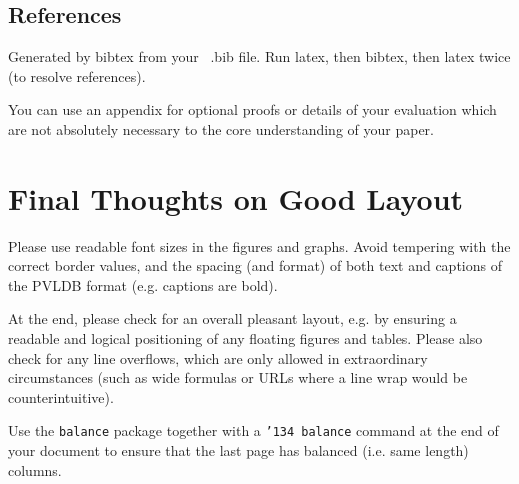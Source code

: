\documentclass{vldb}
\begin{document}


\subsection{References}
Generated by bibtex from your ~.bib file.  Run latex,
then bibtex, then latex twice (to resolve references).


\begin{appendix}
You can use an appendix for optional proofs or details of your evaluation which are not absolutely necessary to the core understanding of your paper. 

\section{Final Thoughts on Good Layout}
Please use readable font sizes in the figures and graphs. Avoid tempering with the correct border values, and the spacing (and format) of both text and captions of the PVLDB format (e.g. captions are bold).

At the end, please check for an overall pleasant layout, e.g. by ensuring a readable and logical positioning of any floating figures and tables. Please also check for any line overflows, which are only allowed in extraordinary circumstances (such as wide formulas or URLs where a line wrap would be counterintuitive).

Use the \texttt{balance} package together with a \texttt{\char'134 balance} command at the end of your document to ensure that the last page has balanced (i.e. same length) columns.

\end{appendix}
\end{document}
